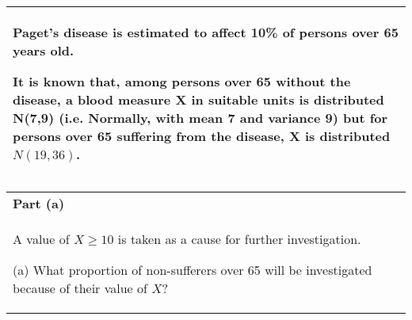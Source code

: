 \documentclass[a4paper,12pt]{article}
\begin{document}
\begin{table}[ht!]
     \centering
     \begin{tabular}{|p{15cm}|}
     \hline        
\noindent \large
Paget's disease is estimated to affect 10\% of persons over 65 years old.\smallskip

It is known that, among persons over 65 without the disease, a blood measure X in suitable units is distributed N(7,9) (i.e. Normally, with mean 7 and variance 9) but for persons over 65 suffering from the disease, X is distributed $N(19,36)$.  \smallskip
\\ \hline
 \end{tabular}
\end{table}

\begin{table}[ht!]
     \centering
     \begin{tabular}{|p{15cm}|}
     \hline        
 \noindent \large \textbf{Part (a)}\\ \large \smallskip
\noindent A value of $X \geq 10$ is taken as a cause for further investigation. \smallskip

(a) What proportion of non-sufferers over 65 will be investigated because of their value of $X$?



\\ \hline
 \end{tabular}
\end{table}
\large
\end{document}
